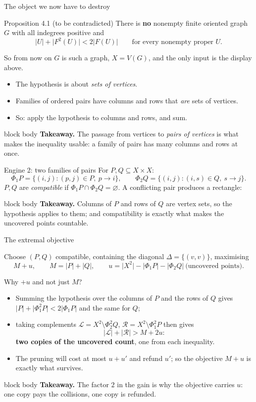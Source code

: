 \documentclass[aspectratio=169,11pt]{beamer}
\newcommand{\abs}[1]{\lvert #1\rvert}
\newcommand{\takeaway}[1]{%
  \vfill
  \begin{beamercolorbox}[wd=\dimexpr\textwidth-9pt\relax,sep=4pt,rounded=true]{block body}
    \footnotesize\color{mainblue}\textbf{Takeaway.} \color{black}#1
  \end{beamercolorbox}}
\begin{document}
\begin{frame}{The object we now have to destroy}
  \begin{block}{Proposition 4.1 (to be contradicted)}
    There is \textbf{no} nonempty finite oriented graph $G$ with all indegrees positive and
    \[
      \abs U+\abs{F^2(U)}<2\abs{F(U)}\qquad\text{for every nonempty proper }U .
    \]
  \end{block}
  \medskip
  \small
  So from now on $G$ is such a graph, $X=V(G)$, and the only input is the display above.
  \medskip

  \begin{itemize}
    \item The hypothesis is about \emph{sets of vertices}.
    \item Families of ordered pairs have columns and rows that \emph{are} sets of vertices.
    \item So: apply the hypothesis to columns and rows, and sum.
  \end{itemize}
  \takeaway{The passage from vertices to \emph{pairs of vertices} is what makes the inequality
  usable: a family of pairs has many columns and rows at once.}
\end{frame}

\begin{frame}{Engine 2: two families of pairs}
  \small
  For $P,Q\subseteq X\times X$:
  \[
    \Phi_1P=\{(i,j):(p,j)\in P,\ p\to i\},\qquad
    \Phi_2Q=\{(i,j):(i,s)\in Q,\ s\to j\}.
  \]
  $P,Q$ are \emph{compatible} if $\Phi_1P\cap\Phi_2Q=\varnothing$. A conflicting pair produces a
  rectangle:
  \medskip
  \centering
  \scalebox{0.66}{}
  \takeaway{Columns of $P$ and rows of $Q$ are vertex sets, so the hypothesis applies to them; and
  compatibility is exactly what makes the uncovered points countable.}
\end{frame}

\begin{frame}{The extremal objective}
  \small
  \begin{block}{Choose $(P,Q)$}
    compatible, containing the diagonal $\Delta=\{(v,v)\}$, maximising
    \[
      M+u,\qquad M=\abs P+\abs Q,\qquad
      u=\abs{X^2}-\abs{\Phi_1P}-\abs{\Phi_2Q}\ \text{(uncovered points)}.
    \]
  \end{block}
  \medskip
  Why $+u$ and not just $M$?
  \begin{itemize}
    \item Summing the hypothesis over the columns of $P$ and the rows of $Q$ gives
      $\abs P+\abs{\Phi_1^2P}<2\abs{\Phi_1P}$ and the same for $Q$;
    \item taking complements $\mathcal L=X^2\setminus\Phi_2^2Q$,
      $\mathcal R=X^2\setminus\Phi_1^2P$ then gives
      \[
        \abs{\mathcal L}+\abs{\mathcal R}>M+2u :
      \]
      \textbf{two copies of the uncovered count}, one from each inequality.
    \item The pruning will cost at most $u+u'$ and refund $u'$; so the objective $M+u$ is exactly
      what survives.
  \end{itemize}
  \takeaway{The factor $2$ in the gain is why the objective carries $u$: one copy pays the
  collisions, one copy is refunded.}
\end{frame}
\end{document}
